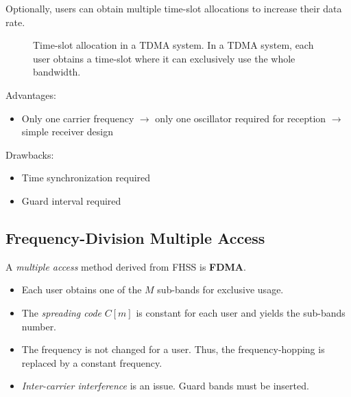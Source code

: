 \begin{refsection}
\begin{remark}
	Optionally, users can obtain multiple time-slot allocations to increase their data rate.
\end{remark}

\begin{figure}[H]
	\centering
	\caption[Time-slot allocation in a \acs{TDMA} system]{Time-slot allocation in a \acs{TDMA} system. In a \acs{TDMA} system, each user obtains a time-slot where it can exclusively use the whole bandwidth.}
\end{figure}

Advantages:
\begin{itemize}
	\item Only one carrier frequency $\rightarrow$ only one oscillator required for reception $\rightarrow$ simple receiver design
\end{itemize}

Drawbacks:
\begin{itemize}
	\item Time synchronization required
	\item Guard interval required
\end{itemize}

\subsection{Frequency-Division Multiple Access}

A \emph{multiple access} method derived from \ac{FHSS} is  \textbf{\acf{FDMA}}.
\begin{itemize}
	\item Each user obtains one of the $M$ sub-bands for exclusive usage.
	\item The \emph{spreading code} $C[m]$ is constant for each user and yields the sub-bands number.
	\item The frequency is not changed for a user. Thus, the frequency-hopping is replaced by a constant frequency.
	\item \emph{Inter-carrier interference} is an issue. Guard bands must be inserted.
\end{itemize}


\end{refsection}
